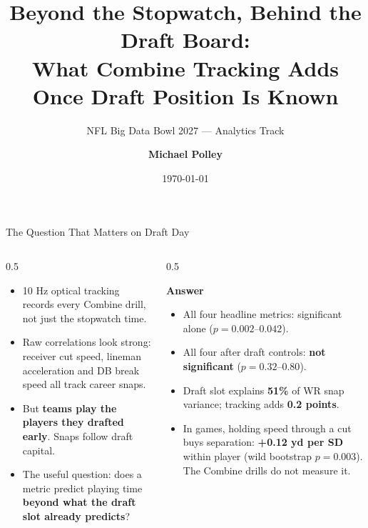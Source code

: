 \documentclass[aspectratio=169, 10pt]{beamer}
\title[\textbf{Behind the Draft Board}]{\textbf{Beyond the Stopwatch, Behind the Draft Board:\\What Combine Tracking Adds Once Draft Position Is Known}}
\subtitle{NFL Big Data Bowl 2027 --- Analytics Track}
\author[M. Polley]{\textbf{Michael Polley}}
\institute[BDB 2027]{NFL Big Data Bowl 2027}
\date{\today}
\begin{document}
\begin{frame}
  \titlepage
\end{frame}

\begin{frame}{The Question That Matters on Draft Day}
  \begin{columns}[T]
    \begin{column}{0.5\textwidth}
      \begin{itemize}
        \item 10 Hz optical tracking records every Combine drill, not just the stopwatch time.
        \item Raw correlations look strong: receiver cut speed, lineman acceleration and DB break speed all track career snaps.
        \item But \textbf{teams play the players they drafted early}. Snaps follow draft capital.
        \item The useful question: does a metric predict playing time \textbf{beyond what the draft slot already predicts}?
      \end{itemize}
    \end{column}
    \begin{column}{0.5\textwidth}
      \begin{block}{\textbf{Answer}}
        \small
        \begin{itemize}
          \item All four headline metrics: significant alone ($p = 0.002$--$0.042$).
          \item All four after draft controls: \textbf{not significant} ($p = 0.32$--$0.80$).
          \item Draft slot explains \textbf{51\%} of WR snap variance; tracking adds \textbf{0.2 points}.
          \item In games, holding speed through a cut buys separation: \textbf{+0.12 yd per SD} within player (wild bootstrap $p = 0.003$). The Combine drills do not measure it.
        \end{itemize}
      \end{block}
    \end{column}
  \end{columns}
\end{frame}
\end{document}
